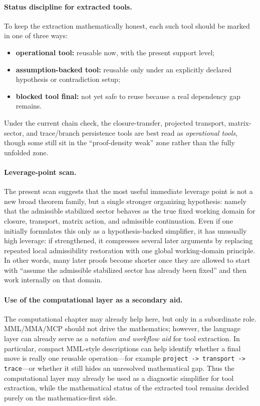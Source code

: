 \documentclass[12pt,a4paper]{article}
\begin{document}
\paragraph{Status discipline for extracted tools.}
To keep the extraction mathematically honest, each such tool should be marked in one of three ways:
\begin{itemize}[leftmargin=2em]
 \item \textbf{operational tool:} reusable now, with the present support level;
 \item \textbf{assumption-backed tool:} reusable only under an explicitly declared hypothesis or contradiction setup;
 \item \textbf{blocked tool final:} not yet safe to reuse because a real dependency gap remains.
\end{itemize}
Under the current chain check, the closure-transfer, projected transport, matrix-sector, and trace/branch persistence tools are best read as \emph{operational tools}, though some still sit in the ``proof-density weak'' zone rather than the fully unfolded zone.

\paragraph{Leverage-point scan.}
The present scan suggests that the most useful immediate leverage point is not a new broad theorem family, but a single stronger organizing hypothesis: namely that the admissible stabilized sector behaves as the true fixed working domain for closure, transport, matrix action, and admissible continuation. Even if one initially formulates this only as a hypothesis-backed simplifier, it has unusually high leverage: if strengthened, it compresses several later arguments by replacing repeated local admissibility restoration with one global working-domain principle. In other words, many later proofs become shorter once they are allowed to start with ``assume the admissible stabilized sector has already been fixed'' and then work internally on that domain.

\paragraph{Use of the computational layer as a secondary aid.}
The computational chapter may already help here, but only in a subordinate role. MML/MMA/MCP should not drive the mathematics; however, the language layer can already serve as a \emph{notation and workflow aid} for tool extraction. In particular, compact MML-style descriptions can help identify whether a final move is really one reusable operation---for example \texttt{project -> transport -> trace}---or whether it still hides an unresolved mathematical gap. Thus the computational layer may already be used as a diagnostic simplifier for tool extraction, while the mathematical status of the extracted tool remains decided purely on the mathematics-first side.
\end{document}
